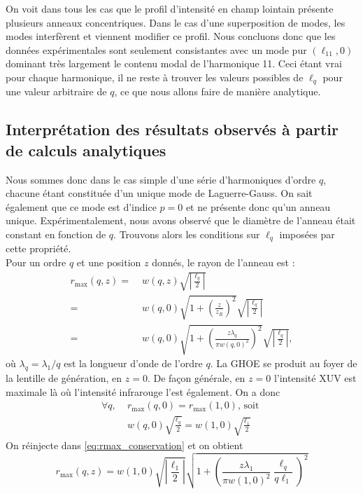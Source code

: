 On voit dans tous les cas que le profil d'intensité en champ lointain présente plusieurs anneaux concentriques. Dans le cas d'une superposition de modes, les modes interfèrent et viennent modifier ce profil. Nous concluons donc que les données expérimentales sont seulement consistantes avec un mode pur $(\ell_{11},0)$ dominant très largement le contenu modal de l'harmonique 11. Ceci étant vrai pour chaque harmonique, il ne reste à trouver les valeurs possibles de $\ell_q$ pour une valeur arbitraire de $q$, ce que nous allons faire de manière analytique.



\subsection{Interprétation des résultats observés à partir de calculs analytiques}
Nous sommes donc dans le cas simple d'une série d'harmoniques d'ordre $q$, chacune étant constituée d'un unique mode de Laguerre-Gauss. On sait également que ce mode est  d'indice $p=0$ et ne présente donc qu'un anneau unique. Expérimentalement, nous avons observé que le diamètre de l'anneau était constant en fonction de $q$. Trouvons alors les conditions sur $\ell_q$ imposées par cette propriété.\\

Pour un ordre $q$ et une position $z$ donnés, le rayon de l'anneau est :
\begin{align}
{r_{{\mathrm{max}}}}\left( {q,z} \right) =& \;w\left( {q,z} \right)\sqrt {\left| {\frac{{{\ell _q}}}{2}} \right|} \nonumber\\ 
=& \;w\left( {q,0} \right)\sqrt {1 + {{\left( {\frac{z}{z_R}} \right)}^2}} \sqrt {\left| {\frac{{{\ell _q}}}{2}} \right|} \nonumber\\
=& \;w\left( {q,0} \right)\sqrt {1 + {{\left( {\frac{{z\lambda _q}}{{{\pi w{{\left( {{q},0} \right)}^2}}}}} \right)}^2}} \sqrt {\left| {\frac{{{\ell _q}}}{2}} \right|},
\label{eq:rmax_conservation}
\end{align}
où ${\lambda _q} = {\lambda _1}/q$ est la longueur d'onde de l'ordre $q$. La GHOE se produit au foyer de la lentille de génération, en $z=0$. De façon générale, en $z=0$ l'intensité XUV est maximale là où l'intensité infrarouge l'est également. On a donc
\begin{align*}
\forall q,\;&{r_{{\mathrm{max}}}}\left( {q,0} \right)={r_{{\mathrm{max}}}}\left( {1,0} \right) \text{, soit }\\
&w\left( {{q},0} \right)\sqrt {\frac{{{\ell _q}}}{2}}  = w\left( {{1},0} \right)\sqrt {\frac{{{\ell _1}}}{2}}
\end{align*}
On réinjecte dans \ref{eq:rmax_conservation} et on obtient
\begin{equation*}
{r_{{\mathrm{max}}}}\left( {q,z} \right) = w\left( {{1},0} \right)\sqrt {\left| {\frac{{{\ell _1}}}{2}} \right|}\sqrt {1 + {{\left( {\frac{{{z\lambda_1}}}{\pi w{{\left( {{1},0} \right)}^2}}\frac{\ell _q}{q{\ell _1}}}\right)}^2}} 
\end{equation*}

